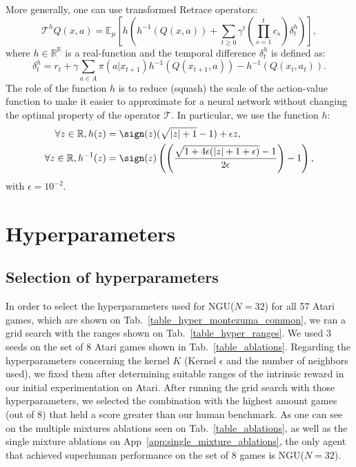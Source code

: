 \documentclass{article} %
\begin{document}
More generally, one can use transformed Retrace operators\citep{pohlen2018observe}:
\begin{equation}
\mathcal{T}^hQ(x,a) =  \mathbb{E}_{\mu}\left[h\left(h^{-1}(Q(x,a)) +\sum_{t\geq0}\gamma^t\left(\prod_{s=1}^tc_s\right)\delta^h_t \right)\right],
\end{equation}
where $h\in\mathbb{R}^\mathbb{R}$ is a real-function and the temporal difference $\delta^h_t$ is defined as:
\begin{equation}
\delta^h_t = r_t + \gamma \sum_{a\in A}\pi(a|x_{t+1})h^{-1}(Q(x_{t+1},a))-h^{-1}(Q(x_t, a_t)).  
\end{equation}
The role of the function $h$ is to reduce (squash) the scale of the action-value function to make it easier to approximate for a neural network without changing the optimal property of the operator $\mathcal{T}$.  
In particular, we use the function $h$:
\begin{align}
\forall z\in\mathbb{R}, h(z)&=\sign(z)(\sqrt{|z|+1}-1) + \epsilon z,
\\
\forall z\in\mathbb{R}, h^{-1}(z)&=\sign(z)\left(\left(\frac{\sqrt{1+4\epsilon(|z|+1+\epsilon)}-1}{2\epsilon}\right)-1\right),
\end{align}
with $\epsilon=10^{-2}$.

\newpage
\section{Hyperparameters}
\label{hyperparameters}

\subsection{Selection of hyperparameters}
In order to select the hyperparameters used for NGU($N=32$) for all 57 Atari games, which are shown on Tab.~\ref{table_hyper_montezuma_common}, we ran a grid search with the ranges shown on Tab.~\ref{table_hyper_ranges}. We used $3$ seeds on the set of $8$ Atari games shown in Tab.~\ref{table_ablations}. Regarding the hyperparameters concerning the kernel $K$ (Kernel $\epsilon$ and the number of neighbors used), we fixed them after determining suitable ranges of the intrinsic reward in our initial experimentation on Atari. After running the grid search with those hyperparameters, we selected the combination with the highest amount games (out of $8$) that held a score greater than our human benchmark. As one can see on the multiple mixtures ablations seen on Tab.~\ref{table_ablations}, as well as the single mixture ablations on App~\ref{app:single_mixture_ablations}, the only agent that achieved superhuman performance on the set of $8$ games is NGU($N=32$).
\end{document}
